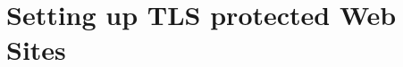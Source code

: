 
\usepackage{minted}
\usepackage{booktabs}


	
	
	\section{Setting up TLS protected Web Sites}
	




